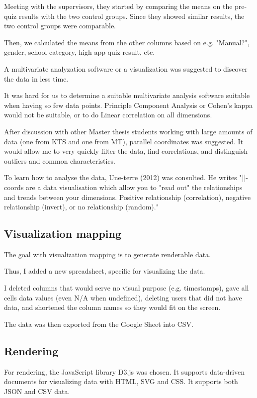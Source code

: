 Meeting with the supervisors, they started by comparing the means on the pre-quiz results with the two control groups. Since they showed similar results, the two control groups were comparable.

Then, we calculated the means from the other columns based on e.g. "Manual?", gender, school category, high app quiz result, etc.

A multivariate analyzation software or a visualization was suggested to discover the data in less time.

It was hard for us to determine a suitable multivariate analysis software suitable when having so few data points. Principle Component Analysis or Cohen's kappa would not be suitable, or to do Linear correlation on all dimensions.

After discussion with other Master thesis students working with large amounts of data (one from KTS and one from MT), parallel coordinates was suggested. It would allow me to very quickly filter the data, find correlations, and distinguish outliers and common characteristics.

To learn how to analyse the data, Une-terre (2012) was consulted. %
He writes "||-coords are a data visualisation which allow you to "read out" the relationships and trends between your dimensions. Positive relationship (correlation), negative relationship (invert), or no relationship (random)."

\subsection{Visualization mapping}
The goal with visualization mapping is to generate renderable data.

Thus, I added a new spreadsheet, specific for visualizing the data.

I deleted columns that would serve no visual purpose (e.g. timestamps), gave all cells data values (even N/A when undefined), deleting users that did not have data, and shortened the column names so they would fit on the screen.

The data was then exported from the Google Sheet into CSV.

\subsection{Rendering}

For rendering, the JavaScript library D3.js was chosen. It supports data-driven documents for visualizing data with HTML, SVG and CSS. It supports both JSON and CSV data.

